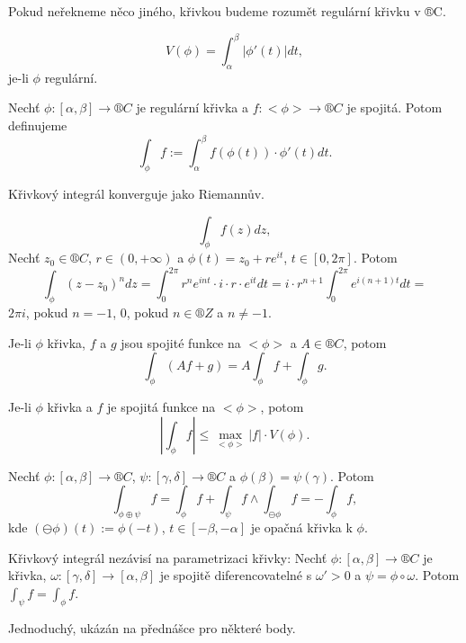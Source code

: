 \documentclass[12pt]{article}					%
\begin{document}
\begin{poznamka}[Úmluva]
	Pokud neřekneme něco jiného, křivkou budeme rozumět regulární křivku v ®C.
\end{poznamka}

\begin{definice}
	$$ V(\phi) = \int_\alpha^\beta |\phi'(t)| dt, $$
	je-li $\phi$ regulární.
\end{definice}

\begin{definice}
	Nechť $\phi: [\alpha, \beta] \rightarrow ®C$ je regulární křivka a $f: <\phi> \rightarrow ®C$ je spojitá. Potom definujeme
	$$ \int_\phi f := \int_\alpha^\beta f(\phi(t))·\phi'(t) dt. $$
\end{definice}

\begin{poznamka}
	Křivkový integrál konverguje jako Riemannův.

	$$ \int_\phi f(z) dz, $$
	Nechť $z_0 \in ®C$, $r \in (0, +∞)$ a $\phi(t) = z_0 + r e^{it}$, $t \in [0, 2\pi]$. Potom
	$$ \int_\phi (z - z_0)^n dz = \int_0^{2\pi} r^n e^{i n t}·i·r·e^{it} dt = i·r^{n+1} \int_0^{2\pi} e^{i(n + 1) t} dt = $$
	$2\pi i$, pokud $n = -1$, 0, pokud $n \in ®Z$ a $n ≠ -1$.
\end{poznamka}

\begin{tvrzeni}
	Je-li $\phi$ křivka, $f$ a $g$ jsou spojité funkce na $<\phi>$ a $A \in ®C$, potom
	$$ \int_\phi (Af + g) = A\int_\phi f + \int_\phi g. $$

	Je-li $\phi$ křivka a $f$ je spojitá funkce na $<\phi>$, potom
	$$ \left|\int_\phi f\right| ≤ \max_{<\phi>} |f|·V(\phi). $$

	Nechť $\phi: [\alpha, \beta] \rightarrow ®C$, $\psi: [\gamma, \delta] \rightarrow ®C$ a $\phi(\beta) = \psi(\gamma)$. Potom
	$$ \int_{\phi \oplus \psi} f = \int_\phi f + \int_\psi f \land \int_{\ominus\phi} f = - \int_\phi f, $$
	kde $(\ominus\phi)(t) := \phi(-t)$, $t \in [-\beta, -\alpha]$ je opačná křivka k $\phi$.

	Křivkový integrál nezávisí na parametrizaci křivky: Nechť $\phi: [\alpha, \beta] \rightarrow ®C$ je křivka, $\omega: [\gamma, \delta] \rightarrow [\alpha, \beta]$ je spojitě diferencovatelné s $\omega' > 0$ a $\psi = \phi\circ\omega$. Potom $\int_\psi f = \int_\phi f$.

	\begin{dukazin}
		Jednoduchý, ukázán na přednášce pro některé body.
	\end{dukazin}
\end{tvrzeni}
\end{document}
